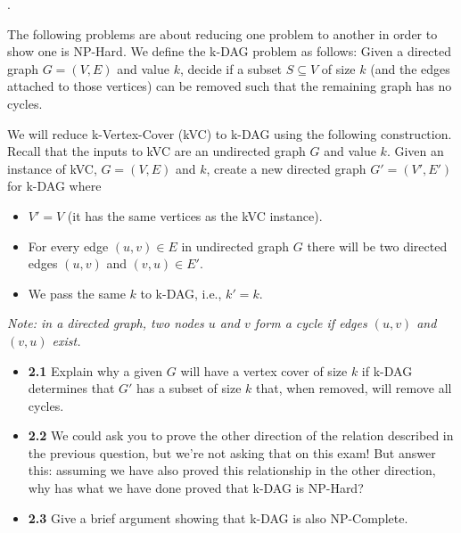 \documentclass[12pt]{article}
\newcounter{quesnum}
\newcommand{\question}[2][??]{
\begin{list}{\labelitemi}{\leftmargin=2em}
\item [\arabic{quesnum}.] {#2}
\end{list}
\addtocounter{quesnum}{1}
}
\begin{document}
\question[3]{
The following problems are about reducing one problem to another in order to show one is NP-Hard.  We define the k-DAG problem as follows: Given a directed graph $G=(V,E)$ and value $k$, decide if a subset $S \subseteq V$ of size $k$ (and the edges attached to those vertices) can be removed such that the remaining graph has no cycles.

We will reduce k-Vertex-Cover (kVC) to k-DAG using the following construction.  Recall that the inputs to kVC are an undirected graph $G$ and value $k$.  Given an instance of kVC, $G=(V,E)$ and $k$, create a new directed graph $G'=(V',E')$ for k-DAG where

\begin{itemize}
    \item $V'=V$ (it has the same vertices as the kVC instance).

    \item For every edge $(u,v) \in E$ in undirected graph $G$ there will be two directed edges $(u,v)$ and $(v,u) \in E'$.
    
    \item We pass the same $k$ to k-DAG, i.e., $k' = k$.
\end{itemize}

\emph{Note: in a directed graph, two nodes $u$ and $v$ form a cycle if edges $(u,v)$ and $(v,u)$ exist.}

\begin{itemize}
	\item \textbf{2.1} Explain why a given $G$ will have a vertex cover of size $k$ if k-DAG determines that $G'$ has a subset of size $k$ that, when removed, will remove all cycles.

	\item \textbf{2.2} We could ask you to prove the other direction of the relation described in the previous question, but we’re not asking that on this exam!  But answer this: assuming we have also proved this relationship in the other direction, why has what we have done proved that k-DAG is NP-Hard?

	\item \textbf{2.3} Give a brief argument showing that k-DAG is also NP-Complete.
\end{itemize}
}
\end{document}
